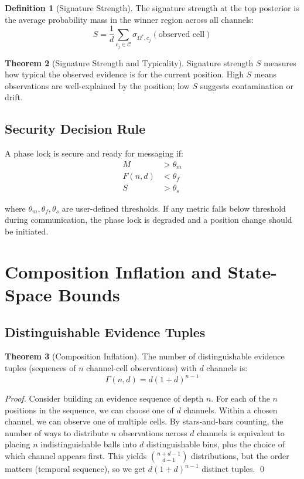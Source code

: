 \documentclass[11pt,a4paper]{article}
\theoremstyle{definition}
\newtheorem{definition}{Definition}[section]
\newtheorem{theorem}[definition]{Theorem}
\begin{document}
\begin{definition}[Signature Strength]
The signature strength at the top posterior is the average probability mass in the winner region across all channels:
\[
S = \frac{1}{d} \sum_{c_j \in \mathcal{C}} \sigma_{\Omega^*, c_j}(\text{observed cell})
\]
\end{definition}

\begin{theorem}[Signature Strength and Typicality]
Signature strength $S$ measures how typical the observed evidence is for the current position. High $S$ means observations are well-explained by the position; low $S$ suggests contamination or drift.
\end{theorem}

\subsection{Security Decision Rule}

A phase lock is secure and ready for messaging if:
\begin{align}
M &> \theta_m \\
F(n, d) &< \theta_f \\
S &> \theta_s
\end{align}

where $\theta_m, \theta_f, \theta_s$ are user-defined thresholds. If any metric falls below threshold during communication, the phase lock is degraded and a position change should be initiated.

\section{Composition Inflation and State-Space Bounds}
\label{sec:composition}

\subsection{Distinguishable Evidence Tuples}

\begin{theorem}[Composition Inflation]
The number of distinguishable evidence tuples (sequences of $n$ channel-cell observations) with $d$ channels is:
\[
\Gamma(n, d) = d(1 + d)^{n-1}
\]
\end{theorem}

\begin{proof}
Consider building an evidence sequence of depth $n$. For each of the $n$ positions in the sequence, we can choose one of $d$ channels. Within a chosen channel, we can observe one of multiple cells. By stars-and-bars counting, the number of ways to distribute $n$ observations across $d$ channels is equivalent to placing $n$ indistinguishable balls into $d$ distinguishable bins, plus the choice of which channel appears first. This yields $\binom{n+d-1}{d-1}$ distributions, but the order matters (temporal sequence), so we get $d(1+d)^{n-1}$ distinct tuples. \qed
\end{proof}
\end{document}
